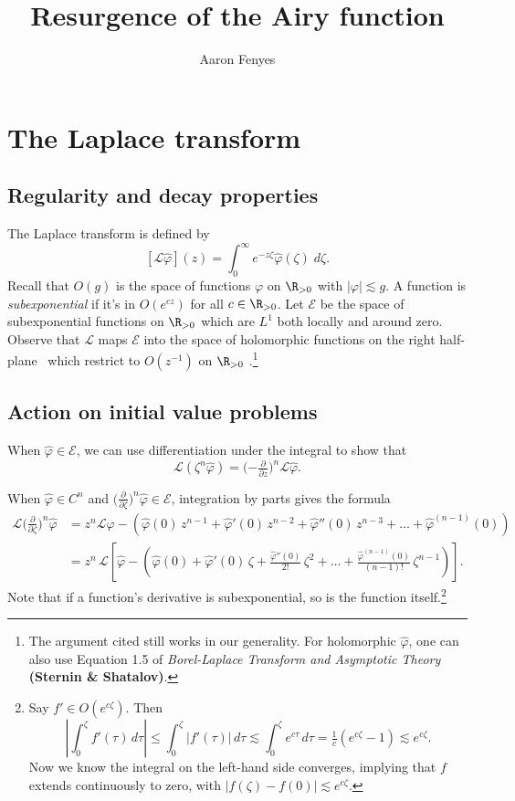 \documentclass{article}
\title{Resurgence of the Airy function}
\author{Aaron Fenyes}
\theoremstyle{definition}
\theoremstyle{plain}
\newcommand{\posreal}{\R_{> 0}}
\newcommand{\laplace}{\mathcal{L}}
\begin{document}
\maketitle
\section{The Laplace transform}
\subsection{Regularity and decay properties}
The Laplace transform is defined by
\[ [\mathcal{L}\hat{\varphi}](z) = \int_0^\infty e^{-z \zeta} \hat{\varphi}(\zeta)\;d\zeta. \]
Recall that $O(g)$ is the space of functions $\varphi$ on $\posreal$ with $|\varphi| \lesssim g$. A function is {\em subexponential} if it's in $O(e^{cz})$ for all $c \in \posreal$. Let $\mathcal{E}$ be the space of subexponential functions on $\posreal$ which are $L^1$ both locally and around zero. Observe that $\laplace$ maps $\mathcal{E}$ into the space of holomorphic functions on the right half-plane~\cite[\S 5.6]{diverg-resurg-i} which restrict to $O(z^{-1})$ on $\posreal$ \cite[equation~1.8]{laplace-tfm}.\footnote{The argument cited still works in our generality. For holomorphic $\hat{\varphi}$, one can also use Equation 1.5 of {\em Borel-Laplace Transform and Asymptotic Theory} \textbf{(Sternin \& Shatalov)}.}
\subsection{Action on initial value problems}
When $\hat{\varphi} \in \mathcal{E}$, we can use differentiation under the integral to show that~\cite[Theorem~1.34]{laplace-tfm}
\[ \laplace (\zeta^n \hat{\varphi}) = \big({-\tfrac{\partial}{\partial z}}\big)^n \laplace \hat{\varphi}. \]

When $\hat{\varphi} \in C^n$ and $\big(\tfrac{\partial}{\partial \zeta}\big)^n \hat{\varphi} \in \mathcal{E}$, integration by parts gives the formula
\begin{align*}
\laplace \big(\tfrac{\partial}{\partial \zeta}\big)^n \hat{\varphi} & = z^n \laplace \hat{\varphi} - \left( \hat{\varphi}(0)\,z^{n-1} + \hat{\varphi}'(0)\,z^{n-2} + \hat{\varphi}''(0)\,z^{n-3} + \ldots + \hat{\varphi}^{(n-1)}(0) \right) \\
& = z^n\,\laplace\left[ \hat{\varphi} - \left( \hat{\varphi}(0) + \hat{\varphi}'(0)\,\zeta + \tfrac{\hat{\varphi}''(0)}{2!}\,\zeta^2 + \ldots + \tfrac{\hat{\varphi}^{(n-1)}(0)}{(n-1)!}\,\zeta^{n-1} \right) \right].
\end{align*}
Note that if a function's derivative is subexponential, so is the function itself.\footnote{Say $f' \in O(e^{c\zeta})$. Then \[ \left|\int_0^\zeta f'(\tau)\,d\tau\right| \le \int_0^\zeta |f'(\tau)|\,d\tau \lesssim \int_0^\zeta e^{c\tau}\,d\tau = \tfrac{1}{c}(e^{c\zeta} - 1) \lesssim e^{c\zeta}.\] Now we know the integral on the left-hand side converges, implying that $f$ extends continuously to zero, with $|f(\zeta) - f(0)| \lesssim e^{c\zeta}$.}
\end{document}
